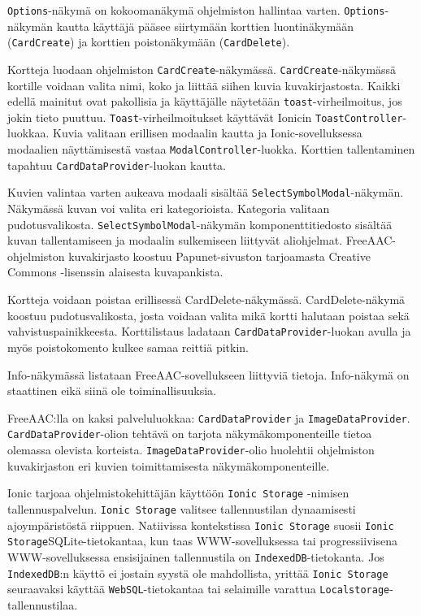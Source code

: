 \documentclass[utf8]{gradu3}
\begin{document}
\texttt{Options}-näkymä on kokoomanäkymä ohjelmiston hallintaa varten. \texttt{Options}-näkymän kautta käyttäjä pääsee siirtymään korttien luontinäkymään (\texttt{CardCreate}) ja korttien poistonäkymään (\texttt{CardDelete}). 

Kortteja luodaan ohjelmiston \texttt{CardCreate}-näkymässä. \texttt{CardCreate}-näkymässä kortille voidaan valita nimi, koko ja liittää siihen kuvia kuvakirjastosta. Kaikki edellä mainitut ovat pakollisia ja käyttäjälle näytetään \texttt{toast}-virheilmoitus, jos jokin tieto puuttuu. \texttt{Toast}-virheilmoitukset käyttävät Ionicin \texttt{ToastController}-luokkaa. Kuvia valitaan erillisen modaalin kautta ja Ionic-sovelluksessa modaalien näyttämisestä vastaa \texttt{ModalController}-luokka.  Korttien tallentaminen tapahtuu \texttt{CardDataProvider}-luokan kautta.

Kuvien valintaa varten aukeava modaali sisältää \texttt{SelectSymbolModal}-näkymän. Näkymässä kuvan voi valita eri kategorioista. Kategoria valitaan pudotusvalikosta. \texttt{SelectSymbolModal}-näkymän komponenttitiedosto sisältää kuvan tallentamiseen ja modaalin sulkemiseen liittyvät aliohjelmat. FreeAAC-ohjelmiston kuvakirjasto koostuu Papunet-sivuston tarjoamasta Creative Commons -lisenssin alaisesta kuvapankista.

Kortteja voidaan poistaa erillisessä CardDelete-näkymässä. CardDelete-näkymä koostuu pudotusvalikosta, josta voidaan valita mikä kortti halutaan poistaa sekä vahvistuspainikkeesta. Korttilistaus ladataan \texttt{CardDataProvider}-luokan avulla ja myös poistokomento kulkee samaa reittiä pitkin.

Info-näkymässä listataan FreeAAC-sovellukseen liittyviä tietoja. Info-näkymä on staattinen eikä siinä ole toiminallisuuksia.

FreeAAC:lla on kaksi palveluluokkaa: \texttt{CardDataProvider} ja \texttt{ImageDataProvider}. \texttt{CardDataProvider}-olion tehtävä on tarjota näkymäkomponenteille tietoa olemassa olevista korteista. \texttt{ImageDataProvider}-olio huolehtii ohjelmiston kuvakirjaston eri kuvien toimittamisesta näkymäkomponenteille.

Ionic tarjoaa ohjelmistokehittäjän käyttöön \texttt{Ionic Storage} -nimisen tallennuspalvelun. \texttt{Ionic Storage} valitsee tallennustilan dynaamisesti ajoympäristöstä riippuen. Natiivissa kontekstissa \texttt{Ionic Storage} suosii \texttt{Ionic Storage}SQLite-tietokantaa, kun taas WWW-sovelluksessa tai progressiivisena WWW-sovelluksessa ensisijainen tallennustila on \texttt{IndexedDB}-tietokanta. Jos \texttt{IndexedDB}:n käyttö ei jostain syystä ole mahdollista, yrittää \texttt{Ionic Storage} seuraavaksi käyttää \texttt{WebSQL}-tietokantaa tai selaimille varattua \texttt{Localstorage}-tallennustilaa.
\end{document}
